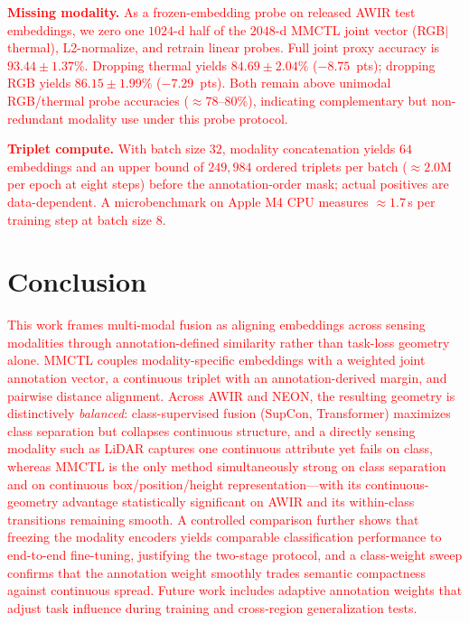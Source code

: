 \documentclass[10pt,twocolumn,letterpaper]{article}
\newcommand{\new}[1]{\textcolor{red}{#1}}
\begin{document}
\new{\noindent\textbf{Missing modality.} As a frozen-embedding probe on released AWIR test embeddings, we zero one $1024$-d half of the $2048$-d MMCTL joint vector (RGB$|$thermal), L2-normalize, and retrain linear probes. Full joint proxy accuracy is $93.44\pm1.37\%$. Dropping thermal yields $84.69\pm2.04\%$ ($-8.75$~pts); dropping RGB yields $86.15\pm1.99\%$ ($-7.29$~pts). Both remain above unimodal RGB/thermal probe accuracies ($\approx$78--80\%), indicating complementary but non-redundant modality use under this probe protocol.}

\new{\noindent\textbf{Triplet compute.} With batch size $32$, modality concatenation yields $64$ embeddings and an upper bound of $249{,}984$ ordered triplets per batch ($\approx 2.0$M per epoch at eight steps) before the annotation-order mask; actual positives are data-dependent. A microbenchmark on Apple M4 CPU measures $\approx 1.7$\,s per training step at batch size $8$.}


\section{Conclusion}
\new{This work frames multi-modal fusion as aligning embeddings across sensing modalities through annotation-defined similarity rather than task-loss geometry alone. MMCTL couples modality-specific embeddings with a weighted joint annotation vector, a continuous triplet with an annotation-derived margin, and pairwise distance alignment. Across AWIR and NEON, the resulting geometry is distinctively \emph{balanced}: class-supervised fusion (SupCon, Transformer) maximizes class separation but collapses continuous structure, and a directly sensing modality such as LiDAR captures one continuous attribute yet fails on class, whereas MMCTL is the only method simultaneously strong on class separation and on continuous box/position/height representation---with its continuous-geometry advantage statistically significant on AWIR and its within-class transitions remaining smooth. A controlled comparison further shows that freezing the modality encoders yields comparable classification performance to end-to-end fine-tuning, justifying the two-stage protocol, and a class-weight sweep confirms that the annotation weight smoothly trades semantic compactness against continuous spread. Future work includes adaptive annotation weights that adjust task influence during training and cross-region generalization tests.}
\end{document}
